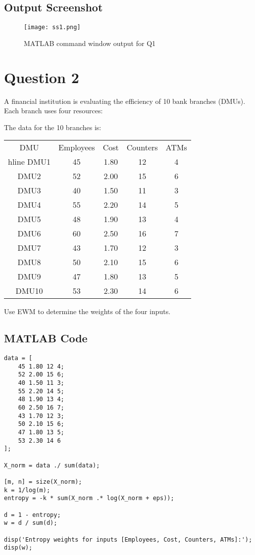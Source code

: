 \documentclass[12pt]{article}
\begin{document}
\subsection*{Output Screenshot}
\begin{figure}[h]
  \centering
  \texttt{[image: ss1.png]}
  \caption{MATLAB command window output for Q1}
\end{figure}

\newpage
\section*{Question 2}
A financial institution is evaluating the efficiency of 10 bank branches (DMUs). Each branch uses four resources:
The data for the 10 branches is:
\begin{center}
\begin{tabular}{c|cccc}
DMU & Employees & Cost & Counters & ATMs \\hline
DMU1  & 45 & 1.80 & 12 & 4 \\
DMU2  & 52 & 2.00 & 15 & 6 \\
DMU3  & 40 & 1.50 & 11 & 3 \\
DMU4  & 55 & 2.20 & 14 & 5 \\
DMU5  & 48 & 1.90 & 13 & 4 \\
DMU6  & 60 & 2.50 & 16 & 7 \\
DMU7  & 43 & 1.70 & 12 & 3 \\
DMU8  & 50 & 2.10 & 15 & 6 \\
DMU9  & 47 & 1.80 & 13 & 5 \\
DMU10 & 53 & 2.30 & 14 & 6 \\
\end{tabular}
\end{center}
Use EWM to determine the weights of the four inputs.

\subsection*{MATLAB Code}
\begin{lstlisting}
data = [
    45 1.80 12 4;
    52 2.00 15 6;
    40 1.50 11 3;
    55 2.20 14 5;
    48 1.90 13 4;
    60 2.50 16 7;
    43 1.70 12 3;
    50 2.10 15 6;
    47 1.80 13 5;
    53 2.30 14 6
];

X_norm = data ./ sum(data);

[m, n] = size(X_norm);
k = 1/log(m);
entropy = -k * sum(X_norm .* log(X_norm + eps));

d = 1 - entropy;
w = d / sum(d);

disp('Entropy weights for inputs [Employees, Cost, Counters, ATMs]:');
disp(w);
\end{lstlisting}
\end{document}

